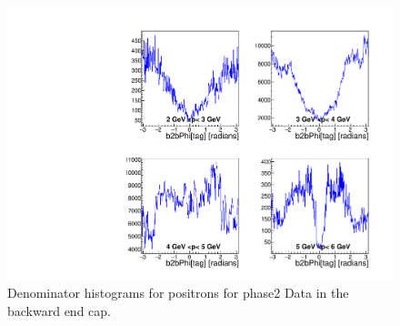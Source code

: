 \documentclass[a4paper,11pt,twosided,final,german,openbib,pdftex,listof=totoc,bibliography=totoc]{scrbook}
\begin{document}
\begin{appendix}
\begin{figure}[!htbp]
	\centering
	\includegraphics[width=\textwidth]{Plots/master/xPMPhiepECD_Data}
	\caption[Momentum $\phi$ Positron Backward End Cap Denominator Histogram Phase2 Data]{Denominator histograms for positrons for phase2 Data in the backward end cap.}
	\label{plt:PMPhiepECD_Data}
\end{figure}


\end{appendix}
\end{document}
